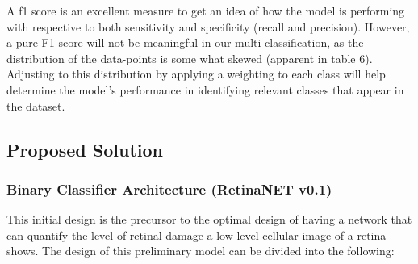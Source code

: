 \documentclass[a4paper]{article}
\begin{document}
        A f1 score is an excellent measure to get an idea of how the model is performing with respective to both sensitivity and specificity (recall and precision). However, a pure F1 score will not be meaningful in our multi classification, as the distribution of the data-points is some what skewed (apparent in table 6). Adjusting to this distribution by applying a weighting to each class will help determine the model's performance in identifying relevant classes that appear in the dataset. 
            
    \newpage
    \subsection{Proposed Solution}
        \subsubsection{Binary Classifier Architecture (RetinaNET v0.1)}
            This initial design is the precursor to the optimal design of having a network that can quantify the level of retinal damage a low-level cellular image of a retina shows. The design of this preliminary model can be divided into the following:
\end{document}
